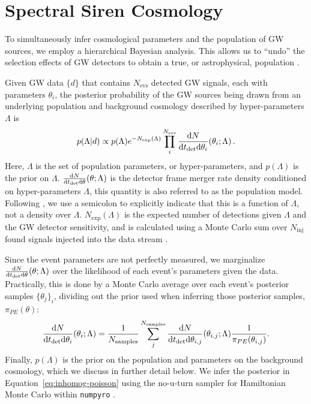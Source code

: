 \documentclass[]{aastex631}
\begin{document}
\section{Spectral Siren Cosmology}
\label{sec:ss}

To simultaneously infer cosmological parameters and the population of GW sources, we employ a hierarchical Bayesian analysis.
This allows us to ``undo'' the selection effects of \ac{GW} detectors to obtain a true, or astrophysical, population .

Given \ac{GW} data $\{d\}$ that contains $N_{\text{evs}}$ detected \ac{GW} signals, each with parameters $\theta_i$, the posterior probability of the \ac{GW} sources being drawn from an underlying population and background cosmology described by hyper-parameters $\Lambda$ is \citep{loredo, taylor, mandel}
\begin{equation}
    p(\Lambda|d) \propto p(\Lambda) e^{-N_{\text{exp}}(\Lambda)} \prod_i^{N_{\text{evs}}} \frac{\diff N}{\diff t_{\det} \diff \theta_i} (\theta_i;\Lambda) \, .
    \label{eq:inhomog-poisson}
\end{equation}
Here, $\Lambda$ is the set of population parameters, or hyper-parameters, and $p(\Lambda)$ is the prior on $\Lambda$.
$\frac{\text{d} N}{\text{d} t_{\det} \text{d} \theta} (\theta;\Lambda)$ is the detector frame merger rate density conditioned on hyper-parameters $\Lambda$, this quantity is also referred to as the population model. 
Following \citet{callister_parameter-free_2023}, we use a semicolon to explicitly indicate that this is a function of $\Lambda$, not a density over $\Lambda$.
$N_{\text{exp}}(\Lambda)$ is the expected number of detections given $\Lambda$ and the \ac{GW} detector sensitivity, and is calculated using a Monte Carlo sum over $N_{\text{inj}}$ found signals injected into the data stream \citep[see][for a detailed explanation of this process]{essick}.

Since the event parameters are not perfectly measured, we marginalize $\frac{\text{d} N}{\text{d} t_{\det} \text{d} \theta} (\theta;\Lambda)$ over the likelihood of each event's parameters given the data.
Practically, this is done by a Monte Carlo average over each event's posterior samples $\{\theta_j\}_i$, dividing out the prior used when inferring those posterior samples, $\pi_{PE}(\theta)$:
\begin{equation}
    \frac{\diff N}{\diff t_{\det} \diff \theta_i} (\theta_i;\Lambda) = \frac{1}{N_{\text{samples}}}\sum_j^{N_{\text{samples}}} \frac{\diff N}{\diff t_{\det} \diff \theta_{i,j}} (\theta_{i,j};\Lambda) \frac{1}{\pi_{PE}(\theta_{i,j})} .
    \label{eq:single-event-likelihood}
\end{equation}
Finally, $p(\Lambda)$ is the prior on the population and parameters on the background cosmology, which we discuss in further detail below.
We infer the posterior in Equation~\ref{eq:inhomog-poisson} using the no-u-turn sampler for Hamiltonian Monte Carlo within \texttt{numpyro} \citep{hoffman_no-u-turn_2011, numpyro}. 
\end{document}
